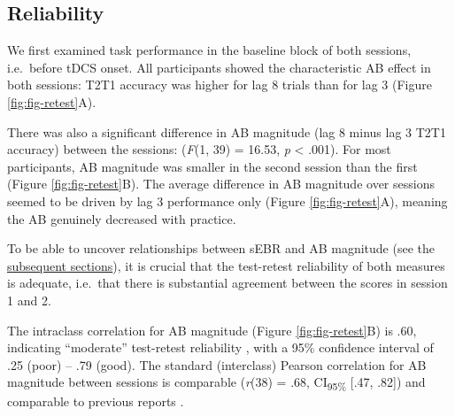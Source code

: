 \documentclass[11pt,]{memoir}
\begin{document}
\hypertarget{AB_sEBR-results-rel}{%
\subsection{Reliability}\label{AB_sEBR-results-rel}}

We first examined task performance in the baseline block of both sessions, i.e.~before tDCS onset. All participants showed the characteristic AB effect in both sessions: T2\textbar{}T1 accuracy was higher for lag 8 trials than for lag 3 (Figure \ref{fig:fig-retest}A).

There was also a significant difference in AB magnitude (lag 8 minus lag 3 T2\textbar{}T1 accuracy) between the sessions: (\emph{F}(1, 39) = 16.53, \emph{p} \textless{} .001). For most participants, AB magnitude was smaller in the second session than the first (Figure \ref{fig:fig-retest}B). The average difference in AB magnitude over sessions seemed to be driven by lag 3 performance only (Figure \ref{fig:fig-retest}A), meaning the AB genuinely decreased with practice.

To be able to uncover relationships between sEBR and AB magnitude (see the \protect\hyperlink{AB_sEBR-ABmag}{subsequent sections}), it is crucial that the test-retest reliability of both measures is adequate, i.e.~that there is substantial agreement between the scores in session 1 and 2.

The intraclass correlation for AB magnitude (Figure \ref{fig:fig-retest}B) is .60, indicating ``moderate'' test-retest reliability \autocite{Koo2016}, with a 95\% confidence interval of .25 (poor) -- .79 (good). The standard (interclass) Pearson correlation for AB magnitude between sessions is comparable (\emph{r}(38) = .68, CI\textsubscript{95\%} {[}.47, .82{]}) and comparable to previous reports \autocite{Dale2013}.
\end{document}
